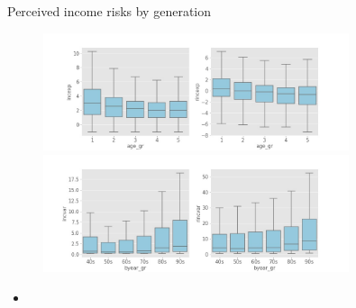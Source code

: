 \documentclass{beamer}
\begin{document}
\begin{frame}{Perceived income risks by generation}
	\begin{figure}
		\centering
		\label{boxplot_byear_gr}
		\includegraphics[width=0.8\textwidth]{figures/boxplot_exp_byear_gr} \\
		\includegraphics[width=0.8\textwidth]{figures/boxplot_var_byear_gr}
	\end{figure}
	\begin{itemize}
		\item 
	\end{itemize}
\end{frame}
\end{document}
